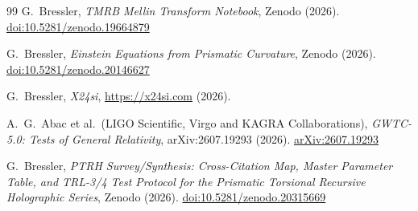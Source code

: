 \documentclass[11pt,a4paper]{article}
\begin{document}
\begin{thebibliography}{99}
  G.~Bressler,
  \textit{TMRB Mellin Transform Notebook},
  Zenodo (2026).
  \href{https://doi.org/10.5281/zenodo.19664879}{doi:10.5281/zenodo.19664879}

  G.~Bressler,
  \textit{Einstein Equations from Prismatic Curvature},
  Zenodo (2026).
  \href{https://doi.org/10.5281/zenodo.20146627}{doi:10.5281/zenodo.20146627}

  G.~Bressler,
  \textit{X24si},
  \href{https://x24si.com}{https://x24si.com} (2026).

  A.~G.~Abac et al.\ (LIGO Scientific, Virgo and KAGRA Collaborations),
  \textit{GWTC-5.0: Tests of General Relativity},
  arXiv:2607.19293 (2026).
  \href{https://arxiv.org/abs/2607.19293}{arXiv:2607.19293}

  G.~Bressler,
  \textit{PTRH Survey/Synthesis: Cross-Citation Map, Master Parameter Table,
    and TRL-3/4 Test Protocol for the Prismatic Torsional Recursive Holographic
    Series},
  Zenodo (2026).
  \href{https://doi.org/10.5281/zenodo.20315669}{doi:10.5281/zenodo.20315669}

\end{thebibliography}
\end{document}
